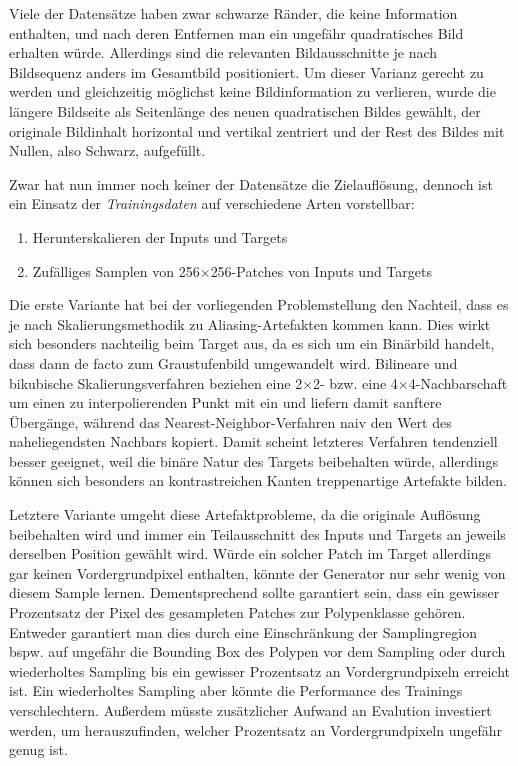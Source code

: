 Viele der Datensätze haben zwar schwarze Ränder, die keine Information enthalten, und nach deren Entfernen man ein ungefähr quadratisches Bild erhalten würde.
Allerdings sind die relevanten Bildausschnitte je nach Bildsequenz anders im Gesamtbild positioniert.
Um dieser Varianz gerecht zu werden und gleichzeitig möglichst keine Bildinformation zu verlieren, wurde die längere Bildseite als Seitenlänge des neuen quadratischen Bildes gewählt, der originale Bildinhalt horizontal und vertikal zentriert und der Rest des Bildes mit Nullen, also Schwarz, aufgefüllt.

Zwar hat nun immer noch keiner der Datensätze die Zielauflösung, dennoch ist ein Einsatz der \emph{Trainingsdaten} auf verschiedene Arten vorstellbar:

\begin{enumerate}
	\item Herunterskalieren der Inputs und Targets
	\item Zufälliges Samplen von 256$\times$256-Patches von Inputs und Targets
\end{enumerate}

Die erste Variante hat bei der vorliegenden Problemstellung den Nachteil, dass es je nach Skalierungsmethodik zu Aliasing-Artefakten kommen kann.
Dies wirkt sich besonders nachteilig beim Target aus, da es sich um ein Binärbild handelt, dass dann de facto zum Graustufenbild umgewandelt wird.
Bilineare und bikubische Skalierungsverfahren beziehen eine 2$\times$2- bzw. eine 4$\times$4-Nachbarschaft um einen zu interpolierenden Punkt mit ein und liefern damit sanftere Übergänge, während das Nearest-Neighbor-Verfahren naiv den Wert des naheliegendsten Nachbars kopiert.
Damit scheint letzteres Verfahren tendenziell besser geeignet, weil die binäre Natur des Targets beibehalten würde, allerdings können sich besonders an kontrastreichen Kanten treppenartige Artefakte bilden.

Letztere Variante umgeht diese Artefaktprobleme, da die originale Auflösung beibehalten wird und immer ein Teilausschnitt des Inputs und Targets an jeweils derselben Position gewählt wird.
Würde ein solcher Patch im Target allerdings gar keinen Vordergrundpixel enthalten, könnte der Generator nur sehr wenig von diesem Sample lernen.
Dementsprechend sollte garantiert sein, dass ein gewisser Prozentsatz der Pixel des gesampleten Patches zur Polypenklasse gehören.
Entweder garantiert man dies durch eine Einschränkung der Samplingregion bspw. auf ungefähr die Bounding Box des Polypen vor dem Sampling oder durch wiederholtes Sampling bis ein gewisser Prozentsatz an Vordergrundpixeln erreicht ist.
Ein wiederholtes Sampling aber könnte die Performance des Trainings verschlechtern.
Außerdem müsste zusätzlicher Aufwand an Evalution investiert werden, um herauszufinden, welcher Prozentsatz an Vordergrundpixeln ungefähr genug ist.

